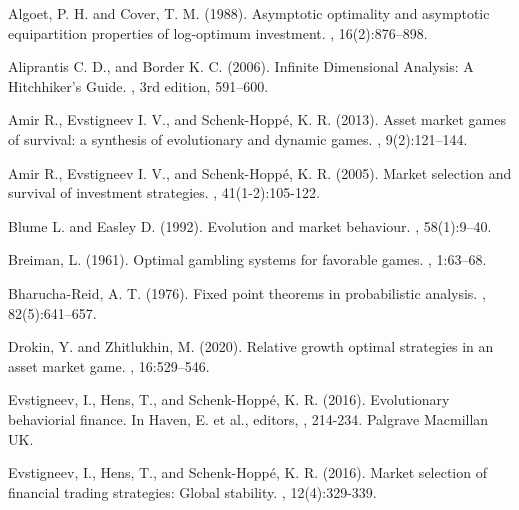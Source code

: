 \documentclass[a4paper,12pt,russian]{article} %
\theoremstyle{definition}
\begin{document}
\begin{thebibliography}{}

 Algoet, P. H. and Cover, T. M. (1988). 
\newblock Asymptotic optimality and asymptotic equipartition properties of log-optimum investment. 
, 16(2):876–898.


 Aliprantis C. D., and Border K. C. (2006).
\newblock Infinite Dimensional Analysis: A Hitchhiker’s Guide.
, 3rd edition, 591–600.


 Amir R., Evstigneev I. V., and Schenk-Hoppé, K. R. (2013).
\newblock Asset market games of survival: a synthesis of evolutionary and dynamic games.
, 9(2):121–144.

 Amir R., Evstigneev I. V., and Schenk-Hoppé, K. R. (2005).
\newblock Market selection and survival of investment strategies.
, 41(1-2):105-122.

 Blume L. and Easley D. (1992).
\newblock Evolution and market behaviour.
, 58(1):9–40.


 Breiman, L. (1961). 
\newblock Optimal gambling systems for favorable games.
, 1:63–68.


 Bharucha-Reid, A. T. (1976).
\newblock Fixed point theorems in probabilistic analysis. , 82(5):641–657.


 Drokin, Y. and Zhitlukhin, M. (2020).
\newblock Relative growth optimal strategies in an asset market game.
, 16:529–546.


 Evstigneev, I., Hens, T., and Schenk-Hoppé, K. R. (2016).
\newblock Evolutionary behaviorial finance. In Haven, E. et al., editors, 
, 214-234. Palgrave Macmillan UK.

 Evstigneev, I., Hens, T., and Schenk-Hoppé, K. R. (2016).
\newblock Market selection of financial trading strategies: Global stability. 
, 12(4):329-339.


\end{thebibliography}
\end{document}

